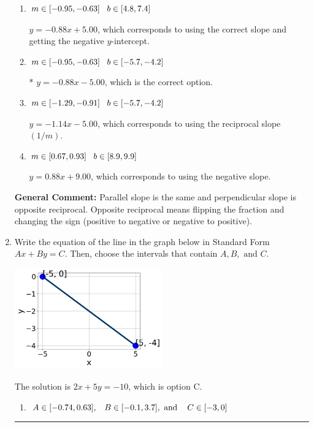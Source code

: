 \documentclass{extbook}[14pt]
\newcommand{\litem}[1]{\item #1

\rule{\textwidth}{0.4pt}}
\begin{document}
\begin{enumerate}
{\begin{enumerate}[label=\Alph*.]
 $y = -0.88x + 10.00$, which corresponds to correct slope and mis-distributing while simplifying to slope-intercept form.
\item \( m \in [-0.95, -0.63] \hspace*{3mm} b \in [4.8, 7.4] \)

 $y = -0.88x + 5.00$, which corresponds to using the correct slope and getting the negative $y$-intercept.
\item \( m \in [-0.95, -0.63] \hspace*{3mm} b \in [-5.7, -4.2] \)

* $y = -0.88x - 5.00$, which is the correct option.
\item \( m \in [-1.29, -0.91] \hspace*{3mm} b \in [-5.7, -4.2] \)

 $y = -1.14x - 5.00$, which corresponds to using the reciprocal slope $(1/m)$.
\item \( m \in [0.67, 0.93] \hspace*{3mm} b \in [8.9, 9.9] \)

 $y = 0.88x + 9.00$, which corresponds to using the negative slope.
\end{enumerate}

\textbf{General Comment:} Parallel slope is the same and perpendicular slope is opposite reciprocal. Opposite reciprocal means flipping the fraction and changing the sign (positive to negative or negative to positive).
}
\litem{
Write the equation of the line in the graph below in Standard Form $Ax+By=C$. Then, choose the intervals that contain $A, B, \text{ and } C$.

\begin{center}
    \includegraphics[width=0.5\textwidth]{../Figures/linearGraphToStandardB.png}
\end{center}


The solution is \( 2x + 5y = -10 \), which is option C.\begin{enumerate}[label=\Alph*.]
\item \( A \in [-0.74, 0.63], \hspace{3mm} B \in [-0.1, 3.7], \text{ and } \hspace{3mm} C \in [-3, 0] \)


\end{enumerate}}
\end{enumerate}
\end{document}
